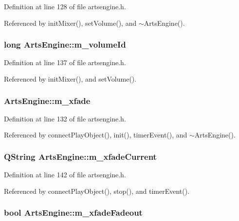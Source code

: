Definition at line 128 of file artsengine.h.

Referenced by init\-Mixer(), set\-Volume(), and $\sim$Arts\-Engine().
\subsubsection{\setlength{\rightskip}{0pt plus 5cm}long {\bf Arts\-Engine::m\_\-volume\-Id}\hspace{0.3cm}{\tt  [private]}}\label{classArtsEngine_ArtsEnginer12}




Definition at line 137 of file artsengine.h.

Referenced by init\-Mixer(), and set\-Volume().
\subsubsection{ {\bf Arts\-Engine::m\_\-xfade}\hspace{0.3cm}{\tt  [private]}}\label{classArtsEngine_ArtsEnginer9}




Definition at line 132 of file artsengine.h.

Referenced by connect\-Play\-Object(), init(), timer\-Event(), and $\sim$Arts\-Engine().
\subsubsection{\setlength{\rightskip}{0pt plus 5cm}QString {\bf Arts\-Engine::m\_\-xfade\-Current}\hspace{0.3cm}{\tt  [private]}}\label{classArtsEngine_ArtsEnginer16}




Definition at line 142 of file artsengine.h.

Referenced by connect\-Play\-Object(), stop(), and timer\-Event().
\subsubsection{\setlength{\rightskip}{0pt plus 5cm}bool {\bf Arts\-Engine::m\_\-xfade\-Fadeout}\hspace{0.3cm}{\tt  [private]}}\label{classArtsEngine_ArtsEnginer14}




